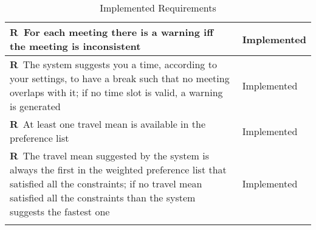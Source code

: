 \begin{longtable}{|m{7cm}|m{7cm}|}
	\textbf{R\reqNum}~For each meeting there is a warning iff the meeting is inconsistent & Implemented \\ \hline
	\textbf{R\reqNum}~The system suggests you a time, according to your settings, to have a break such that no meeting overlaps with it; if no time slot is valid, a warning is generated & Implemented \\ \hline
	\textbf{R\reqNum}~At least one travel mean is available in the preference list & Implemented \\ \hline
	\textbf{R\reqNum}~The travel mean suggested by the system is always the first in the weighted preference list that satisfied all the constraints; if no travel mean satisfied all the constraints than the system suggests the fastest one & Implemented \\ \hline
	\caption{Implemented Requirements}
\end{longtable}
